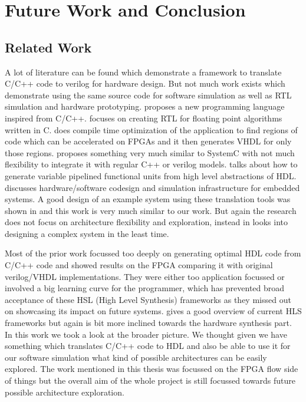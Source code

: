 \setcounter{equation}{0}

\chapter{Future Work and Conclusion }
\label{Future Work and Conclusion }
\section{Related Work}
 A lot of literature can be found which demonstrate a framework to translate C/C++ code to verilog for hardware design. But not much work exists which demonstrate using the same source code for software simulation as well as RTL simulation and hardware prototyping.  \cite{SAC} proposes a new programming language inspired from C/C++. \cite{trident} focuses on creating RTL for floating point algorithms written in C. \cite{ROCC} does compile time optimization of the application to find regions of code which can be accelerated on FPGAs and it then generates VHDL for only those regions. \cite{reactivity} proposes something very much similar to SystemC with not much flexibility to integrate it with regular C++ or verilog models. \cite{hls_pipeline} talks about how to generate variable pipelined functional units from high level abstractions of HDL. \cite{hadi_dcim} discusses hardware/software codesign and simulation infrastructure for embedded systems. A good design of an example system using these translation tools was shown in \cite{piranha} and this work is very much similar to our work. But again the research does not focus on architecture flexibility and exploration, instead in looks into designing a complex system in the least time.
 
Most of the prior work focussed too deeply on generating optimal HDL code from C/C++ code and showed results on the FPGA comparing it with original verilog/VHDL implementations. They were either too application focussed or  involved a big learning curve for the programmer, which has prevented broad acceptance of these HSL (High Level Synthesis) frameworks as they missed out on showcasing its impact on future systems. \cite{hls_overview} gives a good overview of current HLS frameworks but again is bit more inclined towards the hardware synthesis part. In this work we took a look at the broader picture. We thought given we have something which translates C/C++ code to HDL and also be able to use it for our software simulation what kind of possible architectures can be easily explored. The work mentioned in this thesis was focussed on the FPGA flow side of things but the overall aim of the whole project is still focussed towards future possible architecture exploration.

